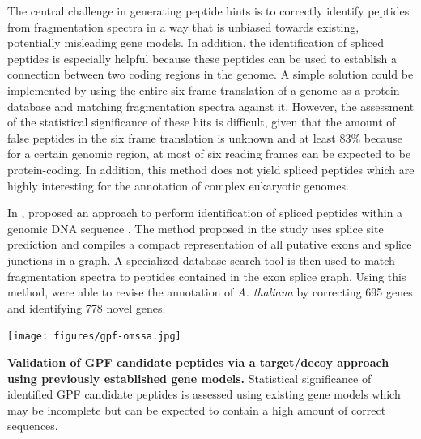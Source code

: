 The central challenge in generating peptide hints is to correctly identify
peptides from fragmentation spectra in a way that is unbiased towards existing,
potentially misleading gene models. 
In addition, the identification of spliced peptides is especially helpful
because these peptides can be used to establish a connection between two
coding regions in the genome.
A simple solution could be implemented by using the entire six frame translation
of a genome as a protein database and matching fragmentation spectra against
it.
However, the assessment of the statistical significance of these hits is 
difficult, given that the amount of false peptides in the six frame translation
is unknown and at least 83\% because for a certain genomic region, at most
of six reading frames can be expected to be protein-coding.
In addition, this method does not yield spliced peptides which are highly
interesting for the annotation of complex eukaryotic genomes.


In \citeyear{Tanner2007}, \citeauthor{Tanner2007} proposed an approach to
perform identification of spliced peptides within a genomic DNA sequence 
\citep{Tanner2007}.
The method proposed in the study uses splice site prediction and compiles
a compact representation of all putative exons and splice junctions in a 
graph.
A specialized database search tool is then used to match fragmentation spectra
to peptides contained in the exon splice graph.
Using this method, \citeauthor{Castellana2008} were able to revise the 
annotation of {\em A. thaliana} by correcting 695 genes and identifying
778 novel genes.

\begin{SCtopfig}
\texttt{[image: figures/gpf-omssa.jpg]}
\caption{
{\bf Validation of GPF candidate peptides via a target/decoy approach
    using previously established gene models.} 
    Statistical significance of identified GPF candidate peptides is 
    assessed using existing gene models which may be incomplete but
    can be expected to contain a high amount of correct sequences.
}
\label{fig:gpf-omssa}
\end{SCtopfig}

